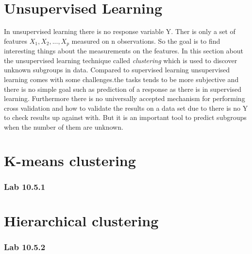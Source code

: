 \chapter{Unsupervised Learning}
\label{chp:unsuplea}
In unsupervised learning there is no response variable Y. Ther is only a set of features $X_1, X_2,..., X_p$ measured on n observations. So the goal is to find interesting things about the measurements on the features. In this section about the unsupervised learning technique called \emph{clustering} which is used to discover unknown subgroups in data.
Compared to supervised learning unsupervised learning comes with some challenges.the tasks tends to be more subjective and there is no simple goal such as prediction of a response as there is in supervised learning. Furthermore there is no universally accepted mechanism for performing cross validation and how to validate the results on a data set due to there is no Y to check results up against with.
But it is an important tool to predict subgroups when the number of them are unknown.  
\chapter{K-means clustering}
\label{chp:clus}

\subsection{Lab 10.5.1}

\chapter{Hierarchical clustering}

\subsection{Lab 10.5.2}